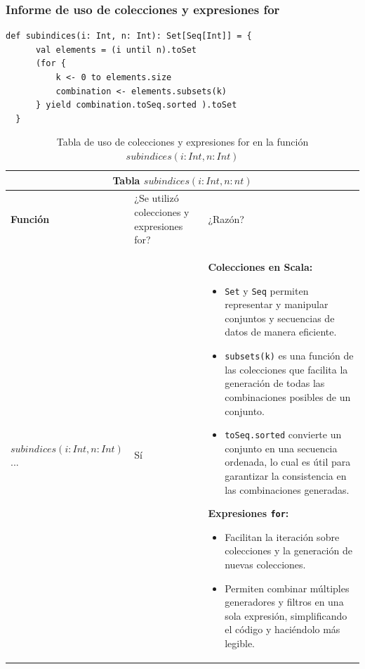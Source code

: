 \documentclass[12pt, a4paper]{article}
\begin{document}
\subsubsection{Informe de uso de colecciones y expresiones for}
\begin{lstlisting}[caption=Código en Scala para la funcion subindices, label=lst:scala_code]
  def subindices(i: Int, n: Int): Set[Seq[Int]] = {
      val elements = (i until n).toSet
      (for {
          k <- 0 to elements.size
          combination <- elements.subsets(k)
      } yield combination.toSeq.sorted ).toSet 
  }
      \end{lstlisting}
\begin{table}[H]
    \scriptsize
   \begin{tabular}{ |p{4cm}|p{3cm}|p{5.5cm}|  }
    \hline
    \multicolumn{3}{|c|}{Tabla $subindices(i:Int,n:nt)$} \\
    \hline
    \textbf{Función}& ¿Se utilizó colecciones y expresiones for?  & ¿Razón?\\
    \hline
     $subindices(i:Int,n:Int)$... & Sí &  
       \textbf{Colecciones en Scala:} 
      \begin{itemize}
          \item \texttt{Set} y \texttt{Seq} permiten representar y manipular conjuntos y secuencias de datos de manera eficiente.
          \item \texttt{subsets(k)} es una función de las colecciones que facilita la generación de todas las combinaciones posibles de un conjunto.
          \item \texttt{toSeq.sorted} convierte un conjunto en una secuencia ordenada, lo cual es útil para garantizar la consistencia en las combinaciones generadas.
      \end{itemize}
      
       \textbf{Expresiones \texttt{for}:} 
      \begin{itemize}
          \item Facilitan la iteración sobre colecciones y la generación de nuevas colecciones.
          \item Permiten combinar múltiples generadores y filtros en una sola expresión, simplificando el código y haciéndolo más legible.
      \end{itemize}
   \\
     \hline
   \end{tabular}
   \centering
   \caption{Tabla de uso de colecciones y expresiones for en la función $subindices(i:Int,n:Int)$}
   \end{table}
\end{document}
